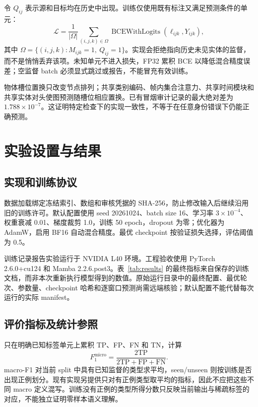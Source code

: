 \documentclass[10pt,twocolumn,letterpaper]{article}
\begin{document}
令 $Q_{ij}$ 表示源和目标均在历史中出现。训练仅使用既有标注又满足预测条件的单元：
\begin{equation}
 \mathcal L=\frac{1}{|\Omega|}
 \sum_{(i,j,k)\in\Omega}
 \operatorname{BCEWithLogits}(\ell_{ijk},Y_{ijk}),
\end{equation}
其中 $\Omega=\{(i,j,k):M_{ijk}=1,\ Q_{ij}=1\}$。实现会拒绝指向历史未见实体的监督，而不是悄悄丢弃该项。未知单元不进入损失，FP32 累积 BCE 以降低混合精度误差；空监督 batch 必须显式跳过或报告，不能冒充有效训练。

物体槽位置换只改变节点排列；共享类别编码、帧内集合注意力、共享时间模块和共享实体对头使图预测随槽位相应置换。已有冒烟审计记录的最大绝对差为 $1.788\times10^{-7}$。这证明特定检查下的实现一致性，不等于在任意身份错误下仍能正确预测。

\section{实验设置与结果}
\subsection{实现和训练协议}
数据加载绑定冻结索引、数组和审核凭据的 SHA-256，防止修改输入后继续沿用旧的训练许可。默认配置使用 seed 20261024、batch size 16、学习率 $3\times10^{-4}$、权重衰减 0.01、梯度裁剪 1.0，训练 50 epoch，dropout 为零；优化器为 AdamW，启用 BF16 自动混合精度。最优 checkpoint 按验证损失选择，评估阈值为 0.5。

训练记录报告实验运行于 NVIDIA L40 环境。工程验收使用 PyTorch 2.6.0+cu124 和 Mamba 2.2.6.post3。表~\ref{tab:results} 的最终指标来自保存的训练文档，而非本次重新执行模型得到的数值。原始运行目录中的最终配置、最优轮次、参数量、checkpoint 哈希和逐窗口预测尚需远端核验；默认配置不能代替每次运行的实际 manifest。

\subsection{评价指标及统计参照}
只在明确已知标签单元上累积 TP、FP、FN 和 TN，计算
\begin{equation}
 F_1^{\mathrm{micro}}=\frac{2\mathrm{TP}}
 {2\mathrm{TP}+\mathrm{FP}+\mathrm{FN}}.
\end{equation}
macro-F1 对当前 split 中具有已知监督的类型求平均，seen/unseen 则按训练是否出现正例划分。现有实现另提供只对有正例类型取平均的指标，因此不应把这些不同 macro 定义混写。训练没有正例的类型所得分数只反映当前输出与稀疏标签的对应，不能独立证明零样本语义理解。
\end{document}
